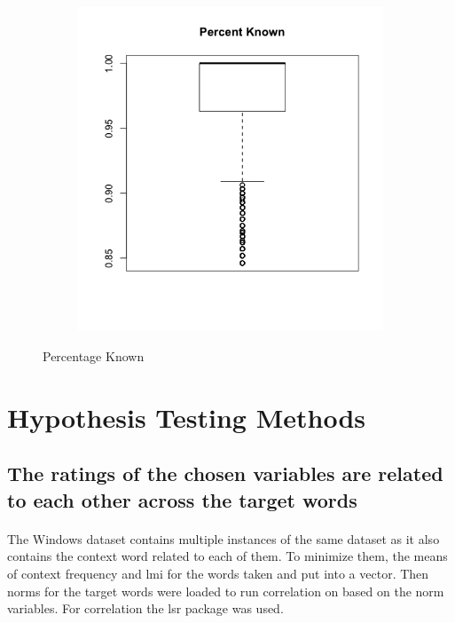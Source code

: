 \documentclass[11pt,a4paper]{article}
\begin{document}
\begin{figure}[H]
\begin{subfigure}[b]{0.4\linewidth}
  \end{subfigure}
  \begin{subfigure}[b]{0.4\linewidth}
    \includegraphics[width=\linewidth]{images/box_perc_known.png}
  \end{subfigure}
  \caption{Percentage Known}
  \label{fig:pk}
\end{figure}

\section{Hypothesis Testing Methods}

\subsection{The ratings of the chosen variables are related to each other across the target words}
\paragraph{}
The Windows dataset contains multiple instances of the same dataset as it also contains the context word related to each of them. To minimize them, the means of context frequency and lmi for the words taken and put into a vector. Then norms for the target words were loaded to run correlation on based on the norm variables. For correlation the lsr\cite{lsr} package was used.
\end{document}

